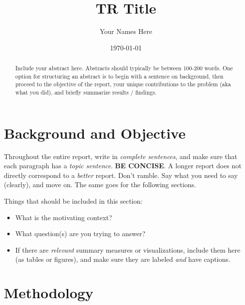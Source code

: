 \documentclass[11pt]{article}
\title{TR Title}
\author{Your Names Here}
\date{\today}
\begin{document}
\maketitle


\begin{abstract}
    Include your abstract here. Abstracts should typically be between 100-200 words. One option for structuring an abstract is to begin with a sentence on background, then proceed to the objective of the report, your unique contributions to the problem (aka what you did), and briefly summarize results / findings.
\end{abstract}

\section*{Background and Objective}

Throughout the entire report, write in \textit{complete sentences}, and make sure that each paragraph has a \textit{topic sentence}. \textbf{BE CONCISE}. A longer report does not directly correspond to a \textit{better} report. Don't ramble. Say what you need to say (clearly), and move on. The same goes for the following sections.

\noindent Things that should be included in this section:

\begin{itemize}
    \item What is the motivating context?
    \item What question(s) are you trying to answer?
    \item If there are \textit{relevant} summary measures or visualizations, include them here (as tables or figures), and make sure they are labeled \textit{and} have captions.
\end{itemize}



\section*{Methodology}
\end{document}
